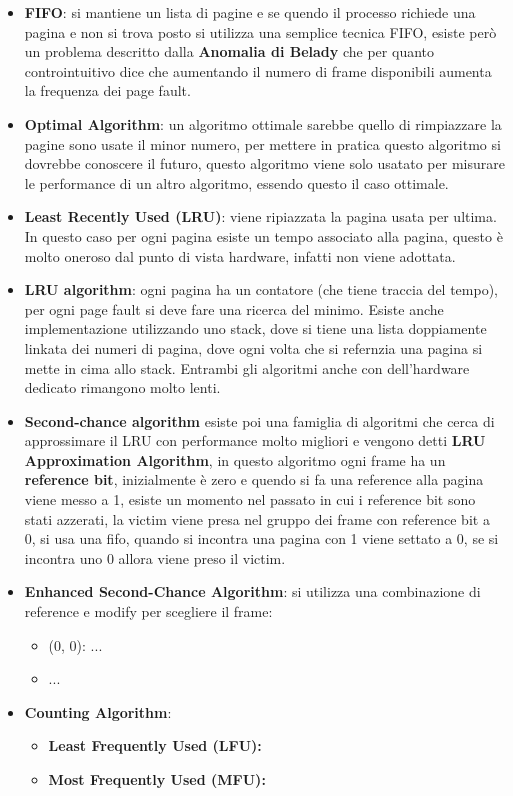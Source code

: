 \documentclass[12pt]{article}
\begin{document}
\begin{itemize}
  \item \textbf{FIFO}: si mantiene un lista di pagine e se quendo il processo richiede una pagina e non si trova posto si utilizza una semplice tecnica FIFO, esiste per\`o un problema descritto dalla \textbf{Anomalia di Belady} che per quanto controintuitivo dice che aumentando il numero di frame disponibili aumenta la frequenza dei page fault.
  \item \textbf{Optimal Algorithm}: un algoritmo ottimale sarebbe quello di rimpiazzare la pagine sono usate il minor numero, per mettere in pratica questo algoritmo si dovrebbe conoscere il futuro, questo algoritmo viene solo usatato per misurare le performance di un altro algoritmo, essendo questo il caso ottimale.
  \item \textbf{Least Recently Used (LRU)}: viene ripiazzata la pagina usata per ultima. In questo caso per ogni pagina esiste un tempo associato alla pagina, questo \`e molto oneroso dal punto di vista hardware, infatti non viene adottata.
  \item \textbf{LRU algorithm}: ogni pagina ha un contatore (che tiene traccia del tempo), per ogni page fault si deve fare una ricerca del minimo. Esiste anche implementazione utilizzando uno stack, dove si tiene una lista doppiamente linkata dei numeri di pagina, dove ogni volta che si refernzia una pagina si mette in cima allo stack. Entrambi gli algoritmi anche con dell'hardware dedicato rimangono molto lenti.
  \item \textbf{Second-chance algorithm} esiste poi una famiglia di algoritmi che cerca di approssimare il LRU con performance molto migliori e vengono detti \textbf{LRU Approximation Algorithm}, in questo algoritmo ogni frame ha un \textbf{reference bit}, inizialmente \`e zero e quendo si fa una reference alla pagina viene messo a 1, esiste un momento nel passato in cui i reference bit sono stati azzerati, la victim viene presa nel gruppo dei frame con reference bit a 0, si usa una fifo, quando si incontra una pagina con 1 viene settato a 0, se si incontra uno 0 allora viene preso il victim.
  \item \textbf{Enhanced Second-Chance Algorithm}: si utilizza una combinazione di reference e modify per scegliere il frame:
    \begin{itemize}
      \item (0, 0): ...
      \item ...
    \end{itemize}
  \item \textbf{Counting Algorithm}: 
    \begin{itemize}
      \item \textbf{Least Frequently Used (LFU):}
      \item \textbf{Most Frequently Used (MFU):}
    \end{itemize}
\end{itemize}
\end{document}
